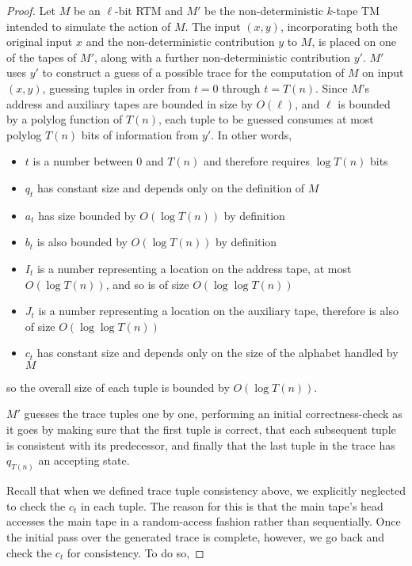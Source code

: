\documentclass[english]{article}
\theoremstyle{plain}
\theoremstyle{definition}
\theoremstyle{plain}
\begin{document}
\begin{proof}
  Let $M$ be an $\ell$-bit RTM and $M'$ be the non-deterministic
  $k$-tape TM intended to simulate the action of $M$. The input
  $(x,y)$, incorporating both the original input $x$ and the
  non-deterministic contribution $y$ to $M$, is placed on one of the
  tapes of $M'$, along with a further non-deterministic contribution
  $y'$. $M'$ uses $y'$ to construct a guess of a possible trace for
  the computation of $M$ on input $(x,y)$, guessing tuples in order
  from $t = 0$ through $t = T(n)$. Since $M$'s address and auxiliary
  tapes are bounded in size by $O(\ell)$, and $\ell$ is bounded by a
  polylog function of $T(n)$, each tuple to be guessed consumes at
  most polylog $T(n)$ bits of information from $y'$. In other words,

  \begin{itemize}
  \item $t$ is a number between $0$ and $T(n)$ and therefore requires
    $\log T(n)$ bits
  \item $q_t$ has constant size and depends only on the definition of
    $M$
  \item $a_t$ has size bounded by $O(\log T(n))$ by definition
  \item $b_t$ is also bounded by $O(\log T(n))$ by definition
  \item $I_t$ is a number representing a location on the address tape,
    at most $O(\log T(n))$, and so is of size $O(\log \log T(n))$
  \item $J_t$ is a number representing a location on the auxiliary
    tape, therefore is also of size $O(\log \log T(n))$
  \item $c_t$ has constant size and depends only on the size of the
    alphabet handled by $M$
  \end{itemize}
  so the overall size of each tuple is bounded by $O(\log T(n))$.

  $M'$ guesses the trace tuples one by one, performing an initial
  correctness-check as it goes by making sure that the first tuple is
  correct, that each subsequent tuple is consistent with its
  predecessor, and finally that the last tuple in the trace has
  $q_{T(n)}$ an accepting state.

  Recall that when we defined trace tuple consistency above, we
  explicitly neglected to check the $c_t$ in each tuple. The reason
  for this is that the main tape's head accesses the main tape in a
  random-access fashion rather than sequentially. Once the initial
  pass over the generated trace is complete, however, we go back and
  check the $c_{t}$ for consistency. To do so,


\end{proof}
\end{document}
